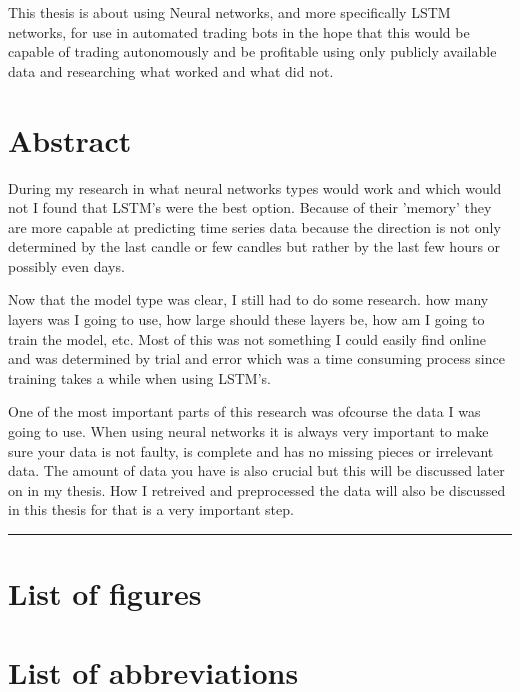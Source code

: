 \documentclass{article}
\makeatletter
\renewcommand\tableofcontents{%
  \null\hfill\textbf{\Huge\contentsname}\hfill\null\par
  \vline\noexpand\rule{\textwidth}{1pt}%
  \@mkboth{\MakeUppercase\contentsname}{\MakeUppercase\contentsname}%
  \@starttoc{toc}%
}
\makeatother
\begin{document}
This thesis is about using Neural networks, and more specifically LSTM networks, for use in automated trading bots in the hope that this would be capable of trading autonomously and be profitable using only publicly available data and researching what worked and what did not.

\newpage
\newpage
\section*{Abstract}
During my research in what neural networks types would work and which would not I found that LSTM's were the best option. Because of their 'memory' they are more capable at predicting time series data because the direction is not only determined by the last candle or few candles but rather by the last few hours or possibly even days.

Now that the model type was clear, I still had to do some research. how many layers was I going to use, how large should these layers be, how am I going to train the model, etc.
Most of this was not something I could easily find online and was determined by trial and error which was a time consuming process since training takes a while when using LSTM's.

One of the most important parts of this research was ofcourse the data I was going to use. When using neural networks it is always very important to make sure your data is not faulty, is complete and has no missing pieces or irrelevant data. The amount of data you have is also crucial but this will be discussed later on in my thesis. How I retreived and preprocessed the data will also be discussed in this thesis for that is a very important step.

\newpage
{}
\tableofcontents

\newpage
\section*{List of figures}


\newpage
\section*{List of abbreviations}
\end{document}

